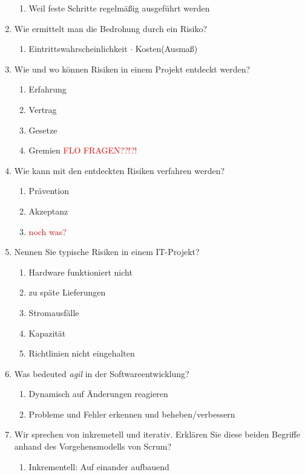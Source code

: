 \documentclass[12pt,a4paper]{article}
\begin{document}
\begin{enumerate}
	\begin{enumerate}
		\item Weil feste Schritte regelmäßig ausgeführt werden
	\end{enumerate}
	\item Wie ermittelt man die Bedrohung durch ein Risiko?
	\begin{enumerate}
		\item Eintrittswahrscheinlichkeit $\cdot$ Kosten(Ausmaß)
	\end{enumerate}
	\item Wie und wo können Risiken in einem Projekt entdeckt werden?
	\begin{enumerate}
		\item Erfahrung
		\item Vertrag
		\item Gesetze
		\item Gremien \textcolor{red}{FLO FRAGEN??!?!}
	\end{enumerate}
	\item Wie kann mit den entdeckten Risiken verfahren werden?
	\begin{enumerate}
		\item Prävention
		\item Akzeptanz
		\item \textcolor{red}{noch was?}
	\end{enumerate}
	\item Nennen Sie typische Risiken in einem IT-Projekt?
	\begin{enumerate}
		\item Hardware funktioniert nicht
		\item zu späte Lieferungen
		\item Stromausfälle
		\item Kapazität
		\item Richtlinien nicht eingehalten
	\end{enumerate}
	\item Was bedeuted \textit{agil} in der Softwareentwicklung?
	\begin{enumerate}
		\item Dynamisch auf Änderungen reagieren
		\item Probleme und Fehler erkennen und beheben/verbessern
	\end{enumerate}
	\item Wir sprechen von inkremetell und iterativ. Erklären Sie diese beiden Begriffe anhand des Vorgehensmodells von Scrum?
	\begin{enumerate}
		\item Inkrementell: Auf einander aufbauend

\end{enumerate}
\end{enumerate}
\end{document}
